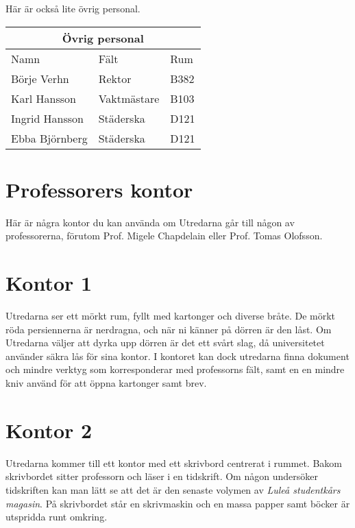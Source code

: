 Här är också lite övrig personal.

\begin{center}
	\label{tab:OvrigPersonal}
	\begin{tabular}{ |p{3cm}|p{3cm}|p{3cm}|  }
		\hline
		\multicolumn{3}{|c|}{Övrig personal} \\
		\hline
		Namn & Fält & Rum \\ 
		\hline
		Börje Verhn & Rektor & B382 \\
		Karl Hansson & Vaktmästare & B103 \\
		Ingrid Hansson & Städerska & D121 \\
		Ebba Björnberg & Städerska & D121 \\
		\hline
	\end{tabular}
\end{center}


\section{Professorers kontor}
%
Här är några kontor du kan använda om Utredarna går till någon av professorerna, förutom Prof. Migele Chapdelain eller Prof. Tomas Olofsson.

\section*{Kontor 1}

Utredarna ser ett mörkt rum, fyllt med kartonger och diverse bråte. De mörkt röda persiennerna är nerdragna, och när ni känner på dörren är den låst. Om Utredarna väljer att dyrka upp dörren är det ett svårt slag, då universitetet använder säkra lås för sina kontor. I kontoret kan dock utredarna finna dokument och mindre verktyg som korresponderar med professorns fält, samt en en mindre kniv använd för att öppna kartonger samt brev.

\section*{Kontor 2}

Utredarna kommer till ett kontor med ett skrivbord centrerat i rummet. Bakom skrivbordet sitter professorn och läser i en tidskrift. Om någon undersöker tidskriften kan man lätt se att det är den senaste volymen av \textit{Luleå studentkårs magasin}. På skrivbordet står en skrivmaskin och en massa papper samt böcker är utspridda runt omkring.

